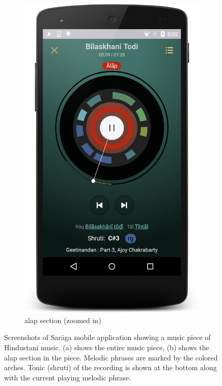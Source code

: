 \begin{figure}
\begin{subfigure}[b]{0.48\textwidth}
		\includegraphics[width=\figSizeNinety]{ch08_applications/figures/saraga2.png}
		\caption{\Gls{alap} section (zoomed in)}
		\label{fig:saraga_alap_section}
	\end{subfigure}
	\caption{Screenshots of Sar\={a}ga mobile application showing a music piece of Hindustani music. (a) shows the entire music piece, (b) shows the \gls{alap} section in the piece. Melodic phrases are marked by the colored arches. Tonic (\gls{shruti}) of the recording is shown at the bottom along with the current playing melodic phrase.}
	\label{fig:saraga_screens}
\end{figure}

